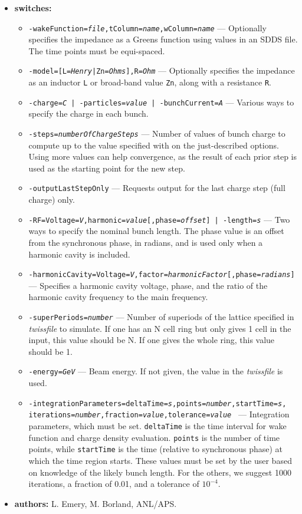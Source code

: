\documentclass[11pt]{article}
\begin{document}
\begin{itemize}
\item {\bf switches:}
\begin{itemize}
\item {\tt -wakeFunction={\em file},tColumn={\em name},wColumn={\em name}} --- Optionally
 specifies the impedance as a Greens function using values in an SDDS file.  The time points
 must be equi-spaced.
\item {\tt -model=[L={\em Henry}|Zn={\em Ohms}],R={\em Ohm}} --- Optionally specifies the
 impedance as an inductor {\tt L} or broad-band value {\tt  Zn}, along with  a resistance {\tt R}.
\item {\tt -charge={\em C} | -particles={\em value} | -bunchCurrent={\em A}} --- Various 
 ways to specify the charge in each bunch.
\item {\tt -steps={\em numberOfChargeSteps}} --- Number of values of bunch charge to compute 
 up to the value specified with on the just-described options.  Using more values can help
 convergence, as the result of each prior step is used as the starting point for the new step.
\item {\tt -outputLastStepOnly}  --- Requests output for the last charge step (full charge) only.
\item {\tt -RF=Voltage={\em V},harmonic={\em value}[,phase={\em offset}] | -length={\em s}} --- Two ways to specify 
 the nominal bunch length. The phase value is an offset from the synchronous phase, in radians, and is
 used only when a harmonic cavity is included.
\item {\tt -harmonicCavity=Voltage={\em V},factor={\em harmonicFactor}[,phase={\em radians}]} --- Specifies a harmonic
 cavity voltage, phase, and the ratio of the harmonic cavity frequency to the main frequency.
\item {\tt -superPeriods={\em number}} --- Number of superiods of the lattice specified in
 {\em twissfile} to simulate.  If one has an N cell ring but only gives 1 cell in the input,
 this value should be N.  If one gives the whole ring, this value should be 1.
\item {\tt -energy={\em GeV}} --- Beam energy. If not given, the value in the {\em twissfile} 
 is used.
\item {\tt -integrationParameters=deltaTime={\em s},points={\em number},startTime={\em s},}\\
 {\tt iterations={\em number},fraction={\em value},tolerance={\em value} } --- Integration 
 parameters, which must be set.  {\tt deltaTime} is the time interval for wake function and
 charge density evaluation.  {\tt points} is the number of time points, while {\tt startTime}
 is the time (relative to synchronous phase) at which the time region starts.  These values
 must be set by the user based on knowledge of the likely bunch length.  For the others, 
 we suggest 1000 iterations, a fraction of 0.01, and a tolerance of $10^{-4}$. 
\end{itemize}

\item {\bf authors:} L. Emery, M. Borland, ANL/APS.
\end{itemize}
\end{document}
